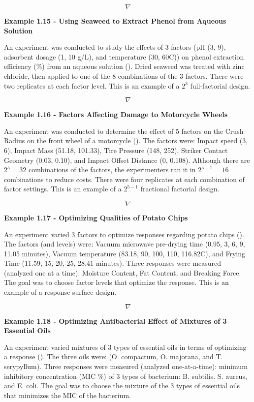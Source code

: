 \documentclass[
]{book}
\begin{document}
\[\nabla\]

\textbf{Example 1.15 - Using Seaweed to Extract Phenol from Aqueous
Solution}

An experiment was conducted to study the effects of 3 factors (pH (3,
9), adsorbent dosage (1, 10 g/L), and temperature (30, 60C)) on phenol
extraction efficiency (\%) from an aqueous solution
(). Dried
seaweed was treated with zinc chloride, then applied to one of the 8
combinations of the 3 factors. There were two replicates at each factor
level. This is an example of a \(2^3\) full-factorial design.

\[\nabla\]

\textbf{Example 1.16 - Factors Affecting Damage to Motorcycle Wheels}

An experiment was conducted to determine the effect of 5 factors on the
Crush Radius on the front wheel of a motorcycle
(). The factors were: Impact
speed (3, 6), Impact Mass (51.18, 101.33), Tire Pressure (148, 252),
Striker Contact Geometry (0.03, 0.10), and Impact Offset Distance (0,
0.108). Although there are \(2^5 = 32\) combinations of the factors, the
experimenters ran it in \(2^{5-1}=16\) combinations to reduce costs.
There were four replicates at each combination of factor settings. This
is an example of a \(2^{5-1}\) fractional factorial design.

\[\nabla\]

\textbf{Example 1.17 - Optimizing Qualities of Potato Chips}

An experiment varied 3 factors to optimize responses regarding potato
chips (). The
factors (and levels) were: Vacuum microwave pre-drying time (0.95, 3, 6,
9, 11.05 minutes), Vacuum temperature (83.18, 90, 100, 110, 116.82C),
and Frying Time (11.59, 15, 20, 25, 28.41 minutes). Three responses were
measured (analyzed one at a time): Moisture Content, Fat Content, and
Breaking Force. The goal was to choose factor levels that optimize the
response. This is an example of a response surface design.

\[\nabla\]

\textbf{Example 1.18 - Optimizing Antibacterial Effect of Mixtures of 3
Essential Oils}

An experiment varied mixtures of 3 types of essential oils in terms of
optimizing a response (). The three oils were: (O. compactum, O. majorana, and T.
serypyllum). Three responses were measured (analyzed one-at-a-time):
minimum inhibitory concentration (MIC \%) of 3 types of bacterium: B.
subtilis. S. aureus, and E. coli. The goal was to choose the mixture of
the 3 types of essential oils that minimizes the MIC of the bacterium.
\end{document}
